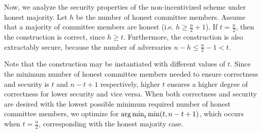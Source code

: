 Now, we analyze the security properties of the non-incentivized scheme under honest majority.
Let $h$ be the number of honest committee members.
Assume that a majority of committee members are honest (i.e. $h \geq \frac{n}{2} + 1$).
If $t = \frac{n}{2}$, then the construction is correct, since $h \geq t$.
Furthermore, the construction is also extractably secure, because the number of adversaries $n - h \leq \frac{n}{2} - 1 < t$.

Note that the construction may be instantiated with different values of $t$.
Since the minimum number of honest committee members needed to ensure correctness and security is $t$ and $n - t + 1$ respectively, higher $t$ ensures a higher degree of correctness for lower security and vice versa.
When both correctness and security are desired with the lowest possible minimum required number of honest committee members, we optimize for $\operatorname*{arg\,min}_{t} \min(t, n - t + 1)$, which occurs when $t = \frac{n}{2}$, corresponding with the honest majority case.

